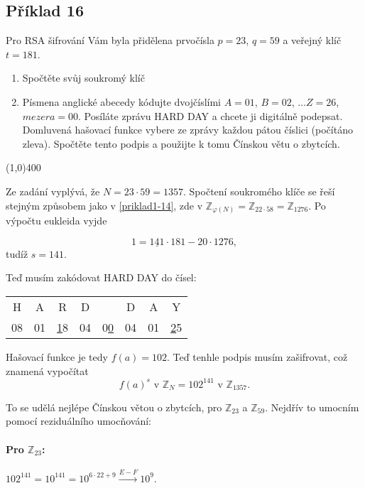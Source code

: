 \documentclass{article}
\begin{document}
\subsection{Příklad 16}
Pro RSA šifrování Vám byla přidělena prvočísla $p = 23$, $q = 59$ a veřejný klíč $t = 181$.
\begin{enumerate}
	\item Spočtěte svůj soukromý klíč
	\item Písmena anglické abecedy kódujte dvojčíslími $A = 01$, $B = 02$, $\ldots Z = 26$, $mezera = 00$. Posíláte zprávu HARD DAY a chcete ji digitálně podepsat. Domluvená hašovací funkce vybere ze zprávy každou pátou číslici (počítáno zleva). Spočtěte tento podpis a použijte k tomu Čínskou větu o zbytcích.
\end{enumerate}

\line(1,0){400}

Ze zadání vyplývá, že $N = 23\cdot59 = 1357$. Spočtení soukromého klíče se řeší stejným způsobem jako v \ref{priklad1-14}, zde v $\mathbb{Z}_{\varphi(N)} = \mathbb{Z}_{22\cdot58} = \mathbb{Z}_{1276}$. Po výpočtu eukleida vyjde

$$1 = \underline{141}\cdot181 - 20\cdot1276,$$
tudíž $s = 141$.

Teď musím zakódovat HARD DAY do čísel:

\begin{center}  %
  \begin{tabular}{c|c|c|c|c|c|c|c}
		H & A & R & D &   & D & A & Y \\ 
		08& 01& \underline{1}8& 04& 0\underline{0}& 04& 01& \underline{2}5 \\
	\end{tabular}
\end{center}

Hašovací funkce je tedy $f(a) = 102$. Teď tenhle podpis musím zašifrovat, což znamená vypočítat
$$ f(a)^s \mbox{ v } \mathbb{Z}_N = 102^{141} \mbox{ v } \mathbb{Z}_{1357}.$$

To se udělá nejlépe Čínskou větou o zbytcích, pro $\mathbb{Z}_{23}$ a $\mathbb{Z}_{59}$. Nejdřív to umocním pomocí reziduálního umocňování:

\paragraph{Pro $\mathbb{Z}_{23}$: } $102^{141} = 10^{141} = 10^{6\cdot22 + 9} \stackrel{E-F}{\rightarrow} 10^9$.
\end{document}
